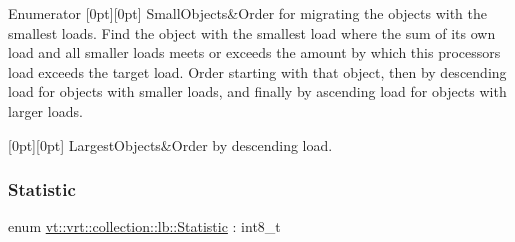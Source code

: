 \begin{DoxyEnumFields}{Enumerator}
[0pt][0pt]{}\mbox{\label{namespacevt_1_1vrt_1_1collection_1_1lb_a3c71e131f84e2ccbb95f43a1058c749caba285d85de6643804425ac332bf81193}} 
Small\+Objects&Order for migrating the objects with the smallest loads. Find the object with the smallest load where the sum of its own load and all smaller loads meets or exceeds the amount by which this processor\textquotesingle{}s load exceeds the target load. Order starting with that object, then by descending load for objects with smaller loads, and finally by ascending load for objects with larger loads. \\
\hline

[0pt][0pt]{}\mbox{\label{namespacevt_1_1vrt_1_1collection_1_1lb_a3c71e131f84e2ccbb95f43a1058c749ca58a14656ff3b03b4af0559d79b5ac566}} 
Largest\+Objects&Order by descending load. \\
\hline

\end{DoxyEnumFields}
\mbox{\label{namespacevt_1_1vrt_1_1collection_1_1lb_af0e20ef9afee77295053aa83bf1348b1}} 
\subsubsection{\texorpdfstring{Statistic}{Statistic}}
{\footnotesize\ttfamily enum \hyperlink{namespacevt_1_1vrt_1_1collection_1_1lb_af0e20ef9afee77295053aa83bf1348b1}{vt\+::vrt\+::collection\+::lb\+::\+Statistic} \+: int8\+\_\+t\hspace{0.3cm}{\ttfamily [strong]}}

